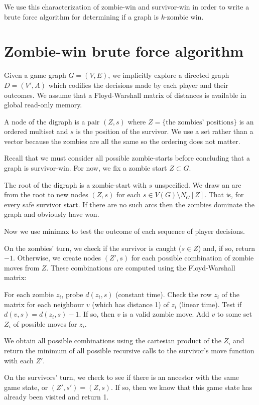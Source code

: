 \documentclass[letterpaper, 10pt]{article}
\begin{document}
We use this characterization of zombie-win and survivor-win in order to
write a brute force algorithm for determining if a graph is $k$-zombie win.

\section{Zombie-win brute force algorithm}

Given a game graph $G = (V,E)$, we implicitly explore a directed graph $D=(V', A)$ which codifies
the decisions made by each player and their outcomes. We assume that a Floyd-Warshall
matrix of distances is available in global read-only memory.

A node of the digraph is a pair $(Z, s)$ where $Z = \{ \text{the zombies' positions} \}$
is an ordered multiset and
$s$ is the position of the survivor. We use a set rather than a vector because the zombies
are all the same so the ordering does not matter.

Recall that we must consider all possible zombie-starts before concluding that a
graph is survivor-win. For now, we fix a zombie start $Z \subset G$.

The root of the digraph is a zombie-start with $s$ unspecified.
We draw an arc from the root to new nodes $(Z,s)$ for each $s \in V(G) \setminus N_G[Z]$.
That is, for every safe survivor start. If there are no such arcs then the zombies
dominate the graph and obviously have won.

Now we use minimax to test the outcome of each sequence
of player decisions.

On the zombies' turn, we check if the survivor is caught ($s \in Z$) and, if so, return
$-1$.
Otherwise, we create nodes $(Z', s)$ for each possible combination
of zombie moves from $Z$. These combinations are computed using the Floyd-Warshall
matrix:

For each zombie $z_i$, probe $d(z_i, s)$ (constant time).
Check the row $z_i$ of the matrix for each neighbour $v$ (which has distance 1) of $z_i$ (linear time).
Test if $d(v, s) = d(z_i, s) -1$. If so, then $v$ is a valid zombie move.
Add $v$ to some set $Z_i$ of possible moves for $z_i$.

We obtain all possible combinations using the cartesian product of the $Z_i$
and return the minimum of all possible recursive calls to the survivor's move function
with each $Z'$.

On the survivors' turn, we check to see if there is an ancestor with
the same game state, or $(Z', s') = (Z, s)$. If so, then we know that
this game state has already been visited and return 1.
\end{document}
